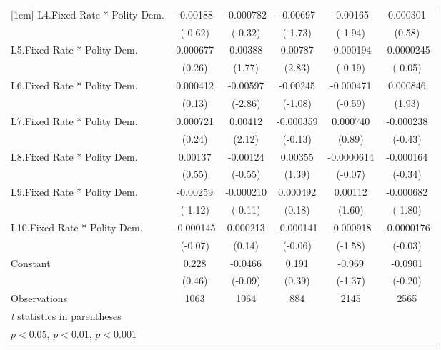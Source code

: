 {\begin{longtable}{l*{5}{c}}
[1em]
L4.Fixed Rate * Polity Dem.& -0.00188         &-0.000782         & -0.00697         & -0.00165         & 0.000301         \\
                &  (-0.62)         &  (-0.32)         &  (-1.73)         &  (-1.94)         &   (0.58)         \\
[1em]
L5.Fixed Rate * Polity Dem.& 0.000677         &  0.00388         &  0.00787\sym{**} &-0.000194         &-0.0000245         \\
                &   (0.26)         &   (1.77)         &   (2.83)         &  (-0.19)         &  (-0.05)         \\
[1em]
L6.Fixed Rate * Polity Dem.& 0.000412         & -0.00597\sym{**} & -0.00245         &-0.000471         & 0.000846         \\
                &   (0.13)         &  (-2.86)         &  (-1.08)         &  (-0.59)         &   (1.93)         \\
[1em]
L7.Fixed Rate * Polity Dem.& 0.000721         &  0.00412\sym{*}  &-0.000359         & 0.000740         &-0.000238         \\
                &   (0.24)         &   (2.12)         &  (-0.13)         &   (0.89)         &  (-0.43)         \\
[1em]
L8.Fixed Rate * Polity Dem.&  0.00137         & -0.00124         &  0.00355         &-0.0000614         &-0.000164         \\
                &   (0.55)         &  (-0.55)         &   (1.39)         &  (-0.07)         &  (-0.34)         \\
[1em]
L9.Fixed Rate * Polity Dem.& -0.00259         &-0.000210         & 0.000492         &  0.00112         &-0.000682         \\
                &  (-1.12)         &  (-0.11)         &   (0.18)         &   (1.60)         &  (-1.80)         \\
[1em]
L10.Fixed Rate * Polity Dem.&-0.000145         & 0.000213         &-0.000141         &-0.000918         &-0.0000176         \\
                &  (-0.07)         &   (0.14)         &  (-0.06)         &  (-1.58)         &  (-0.03)         \\
[1em]
Constant        &    0.228         &  -0.0466         &    0.191         &   -0.969         &  -0.0901         \\
                &   (0.46)         &  (-0.09)         &   (0.39)         &  (-1.37)         &  (-0.20)         \\
\hline
Observations    &     1063         &     1064         &      884         &     2145         &     2565         \\
\hline\hline
\multicolumn{6}{l}{\footnotesize \textit{t} statistics in parentheses}\\
\multicolumn{6}{l}{\footnotesize \sym{*} \(p<0.05\), \sym{**} \(p<0.01\), \sym{***} \(p<0.001\)}\\
\end{longtable}
}

